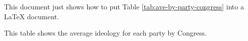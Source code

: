 \documentclass[12pt]{article}
\begin{document}
This document just shows how to put Table \ref{tab:ave-by-party-congress} into a LaTeX document.

\begin{table}[!h]
\caption{This table shows the average ideology for each party by Congress.\label{tab:ave-by-party-congress}}
\end{table}
\end{document}
